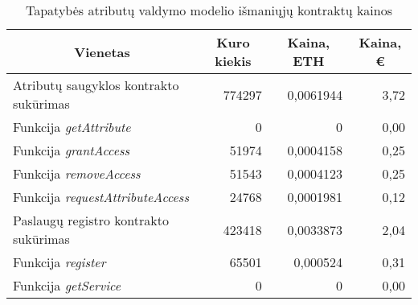 
\begin{table}[H]
    \centering
    \caption{Tapatybės atributų valdymo modelio išmaniųjų kontraktų kainos \cite{EthereumGasStation}}
      \begin{tabular}{|l|r|r|r|}
      \hline
      \multicolumn{1}{|c|}{\textbf{Vienetas}} & \multicolumn{1}{c|}{\textbf{Kuro kiekis}} & \multicolumn{1}{c|}{\textbf{Kaina, ETH}} & \multicolumn{1}{c|}{\textbf{Kaina, €}} \bigstrut\\
      \hline
      \multicolumn{1}{|p{16.5em}|}{Atributų saugyklos kontrakto sukūrimas} & 774297 & 0,0061944 & 3,72 \bigstrut[t]\\
      Funkcija \textit{getAttribute} & 0 & 0 & 0,00 \\
      Funkcija \textit{grantAccess} & 51974 & 0,0004158 & 0,25 \\
      Funkcija \textit{removeAccess} & 51543 & 0,0004123 & 0,25 \\
      Funkcija \textit{requestAttributeAccess} & 24768 & 0,0001981 & 0,12 \bigstrut[b]\\
      \hline
      \multicolumn{1}{|p{16.5em}|}{Paslaugų registro kontrakto sukūrimas} & 423418 & 0,0033873 & 2,04 \bigstrut[t]\\
      Funkcija \textit{register} & 65501 & 0,000524 & 0,31 \\
      Funkcija \textit{getService} & 0 & 0 & 0,00 \bigstrut[b]\\
      \hline
      \end{tabular}%
    \label{tab:contractPrices}%
  \end{table}%
  
  
  
  
  